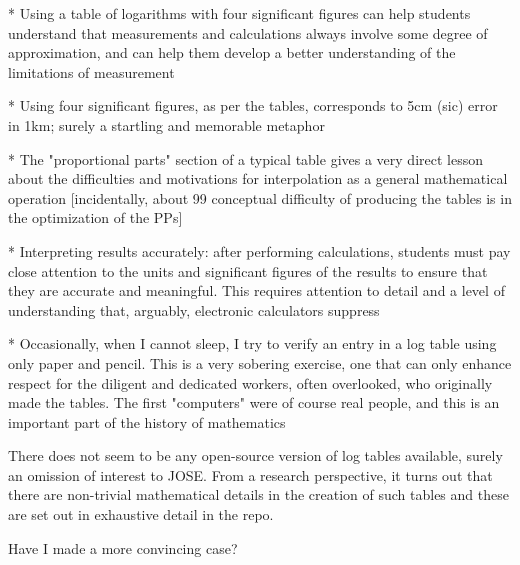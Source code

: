 * Using a table of logarithms with four significant figures can help
students understand that measurements and calculations always involve
some degree of approximation, and can help them develop a better
understanding of the limitations of measurement

* Using four significant figures, as per the tables, corresponds to
5cm (sic) error in 1km; surely a startling and memorable metaphor

* The "proportional parts" section of a typical table gives a very
direct lesson about the difficulties and motivations for interpolation
as a general mathematical operation [incidentally, about 99%
conceptual difficulty of producing the tables is in the optimization
of the PPs]

* Interpreting results accurately: after performing calculations,
students must pay close attention to the units and significant figures
of the results to ensure that they are accurate and meaningful. This
requires attention to detail and a level of understanding that,
arguably, electronic calculators suppress

* Occasionally, when I cannot sleep, I try to verify an entry in a log
table using only paper and pencil.  This is a very sobering exercise,
one that can only enhance respect for the diligent and dedicated
workers, often overlooked, who originally made the tables.  The first
"computers" were of course real people, and this is an important part
of the history of mathematics


There does not seem to be any open-source version of log tables
available, surely an omission of interest to JOSE. From a research
perspective, it turns out that there are non-trivial mathematical
details in the creation of such tables and these are set out in
exhaustive detail in the repo.

Have I made a more convincing case?


